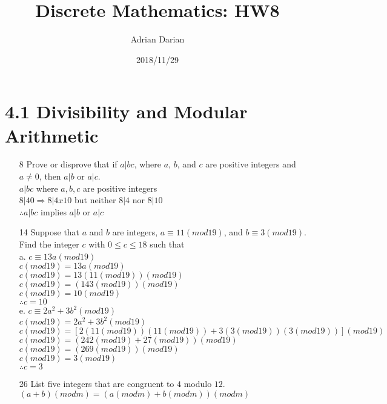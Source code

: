 \documentclass[a4paper]{article}
\title{Discrete Mathematics: HW8}
\author{Adrian Darian}
\date{2018/11/29}
\newcommand\tab[1][0.5cm]{\hspace*{#1}}
\begin{document}
  
  \maketitle

  \section*{4.1 Divisibility and Modular Arithmetic}
  \begin{itemize}
    \item[8] Prove or disprove that if $a | bc$, where $a$, $b$, and $c$ are positive integers and $a \neq 0$, then $a | b$ or $a | c$. \\
    \tab $a | bc$ where $a, b, c$ are positive integers \\
    \tab $8 | 40 \Rightarrow 8 | 4 x 10$ but neither $8 | 4$ nor $8 | 10$ \\
    \tab $\therefore a | bc$ implies $a | b$ or $a | c$
    \item[14] Suppose that $a$ and $b$ are integers, $a \equiv 11 (mod 19)$, and $b \equiv 3 (mod 19)$. Find the integer $c$ with $0 \leq c \leq 18$ such that \\
      a. $c \equiv 13a (mod 19)$ \\
      \tab $c (mod 19) = 13a (mod 19)$ \\
      \tab $c (mod 19) = 13(11 (mod 19))(mod 19)$ \\
      \tab $c (mod 19) = (143 (mod 19))(mod 19)$ \\
      \tab $c (mod 19) = 10 (mod 19)$ \\
      \tab $\therefore c = 10$ \\
      e. $c \equiv 2a^{2} + 3b^{2} (mod 19)$ \\
      \tab $c (mod 19) = 2a^{2} + 3b^{2} (mod 19)$ \\
      \tab $c (mod 19) = [2(11 (mod 19))(11 (mod 19)) + 3(3 (mod 19))(3 (mod 19))](mod 19)$ \\
      \tab $c (mod 19) = (242 (mod 19) + 27 (mod 19))(mod 19)$ \\
      \tab $c (mod 19) = (269 (mod 19))(mod 19)$ \\
      \tab $c (mod 19) = 3 (mod 19)$ \\
      \tab $\therefore c = 3$
    \item[26] List five integers that are congruent to $4$ modulo $12$. \\
    \tab $(a + b)(mod m) = (a (mod m) + b(mod m))(mod m)$ \\

\end{itemize}
\end{document}
